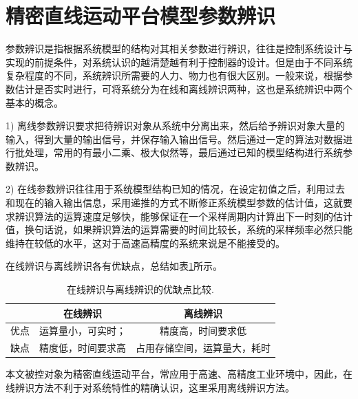 \section{精密直线运动平台模型参数辨识}
参数辨识是指根据系统模型的结构对其相关参数进行辨识，往往是控制系统设计与实现的前提条件，对系统认识的越清楚越有利于控制器的设计。但是由于不同系统复杂程度的不同，系统辨识所需要的人力、物力也有很大区别。一般来说，根据参数估计是否实时进行，可将系统分为在线和离线辨识两种，这也是系统辨识中两个基本的概念。

1) 离线参数辨识要求把待辨识对象从系统中分离出来，然后给予辨识对象大量的输入，得到大量的输出信号，并保存输入输出信号。然后通过一定的算法对数据进行批处理，常用的有最小二乘、极大似然等，最后通过已知的模型结构进行系统参数辨识。

2) 在线参数辨识往往用于系统模型结构已知的情况，在设定初值之后，利用过去和现在的输入输出信息，采用递推的方式不断修正系统模型参数的估计值，这就要求辨识算法的运算速度足够快，能够保证在一个采样周期内计算出下一时刻的估计值，换句话说，如果辨识算法的运算需要的时间比较长，系统的采样频率必然只能维持在较低的水平，这对于高速高精度的系统来说是不能接受的。

在线辨识与离线辨识各有优缺点，总结如表\ref{在线辨识与离线辨识的优缺点比较}所示。
\begin{table}[H]
	\caption{在线辨识与离线辨识的优缺点比较.}
	\label{在线辨识与离线辨识的优缺点比较}
	\centering
	\setlength{\tabcolsep}{3mm}
	\begin{tabular}{ccc}
		\toprule[1.5pt]
		 &在线辨识  &离线辨识 \\
		\midrule
		优点&运算量小，可实时；&精度高，时间要求低\\
		缺点&精度低，时间要求高&占用存储空间，运算量大，耗时\\
		\bottomrule[1.5pt]
	\end{tabular}
\end{table}

本文被控对象为精密直线运动平台，常应用于高速、高精度工业环境中，因此，在线辨识方法不利于对系统特性的精确认识，这里采用离线辨识方法。

